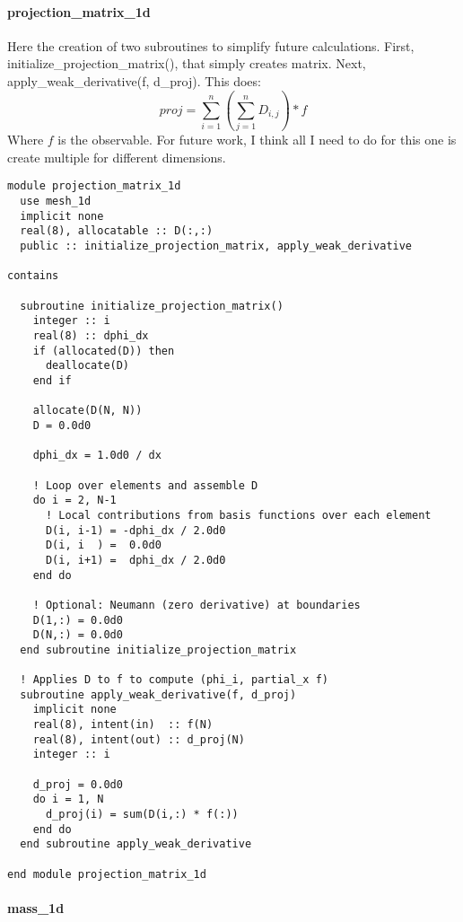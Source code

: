 \paragraph{projection\_matrix\_1d}
Here the creation of two subroutines to simplify future calculations.
First, initialize\_projection\_matrix(), that simply creates matrix.
Next, apply\_weak\_derivative(f, d\_proj). This does:
$$proj=\sum_{i=1}^n(\sum_{j=1}^nD_{i,j})*f$$
Where $f$ is the observable.
For future work, I think all I need to do for this one is create multiple for different dimensions.
\begin{lstlisting}[style=FORTRAN, caption=projection\_matrix\_1d.f90]
module projection_matrix_1d
  use mesh_1d
  implicit none
  real(8), allocatable :: D(:,:)
  public :: initialize_projection_matrix, apply_weak_derivative

contains

  subroutine initialize_projection_matrix()
    integer :: i
    real(8) :: dphi_dx
    if (allocated(D)) then
      deallocate(D)
    end if

    allocate(D(N, N))
    D = 0.0d0

    dphi_dx = 1.0d0 / dx

    ! Loop over elements and assemble D
    do i = 2, N-1
      ! Local contributions from basis functions over each element
      D(i, i-1) = -dphi_dx / 2.0d0
      D(i, i  ) =  0.0d0
      D(i, i+1) =  dphi_dx / 2.0d0
    end do

    ! Optional: Neumann (zero derivative) at boundaries
    D(1,:) = 0.0d0
    D(N,:) = 0.0d0
  end subroutine initialize_projection_matrix

  ! Applies D to f to compute (phi_i, partial_x f)
  subroutine apply_weak_derivative(f, d_proj)
    implicit none
    real(8), intent(in)  :: f(N)
    real(8), intent(out) :: d_proj(N)
    integer :: i

    d_proj = 0.0d0
    do i = 1, N
      d_proj(i) = sum(D(i,:) * f(:))
    end do
  end subroutine apply_weak_derivative

end module projection_matrix_1d
\end{lstlisting}
\paragraph{mass\_1d}

